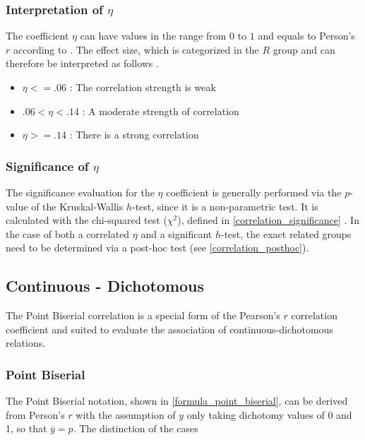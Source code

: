 \subsubsection{Interpretation of $\eta$}
The coefficient $\eta$ can have values in the range from $0$ to $1$ and equals to Person's $r$ according to \parencite{Laken2013}. The effect size, which is categorized in the $R$ group and can therefore be interpreted as follows \parencite{Regber2016,Cohen1988}.
\begin{itemize}
	\item $\eta <= .06$ : The correlation strength is weak
	\item $.06 < \eta < .14$ : A moderate strength of correlation
	\item $\eta >= .14$ : There is a strong correlation
\end{itemize}

\subsubsection{Significance of $\eta$}
The significance evaluation for the $\eta$ coefficient is generally performed via the $p$-value of the Kruskal-Wallis $h$-test, since it is a non-parametric test. It is calculated with the chi-squared test ($\chi^2$), defined in \cref{correlation_significance} \parencite{Filipiak2013}. In the case of both a correlated $\eta$ and a significant $h$-test, the exact related groups need to be determined via a post-hoc test (see \cref{correlation_posthoc}).

\subsection{Continuous - Dichotomous}
The Point Biserial correlation is a special form of the Pearson's $r$ correlation coefficient and suited to evaluate the association of continuous-dichotomous relations. 

\subsubsection{Point Biserial}
The Point Biserial notation, shown in \cref{formula_point_biserial}, can be derived from Person's $r$ with the assumption of $y$ only taking dichotomy values of 0 and 1, so that $\bar{y} = p$. The distinction of the cases

